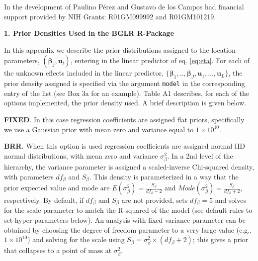 \documentclass[article,shortnames,nojss]{jss}
\begin{document}
In the development of  Paulino P\'erez and 
Gustavo de los Campos had financial support 
provided by NIH Grants: R01GM099992 and R01GM101219.



\appendix
\appendixpage

\textbf{\large{1. Prior Densities Used in the BGLR R-Package}}
\vspace{0.5cm}

In this appendix we describe the prior distributions assigned 
to the location parameters, $(\boldsymbol \beta_j, \boldsymbol u_l)$,
entering in the linear predictor of eq. \eqref{eq:eta}. For each of the unknown effects included in the linear predictor, 
$\{\boldsymbol \beta_1,..,\boldsymbol \beta_J,\boldsymbol u_1,...,\boldsymbol u_L\}$, 
the prior density assigned is specified via 
the argument \texttt{model} in the corresponding entry of the list 
(see Box 3a for an example).  Table A1 describes, for each of 
the options implemented, the prior density used. 
A brief description is given below. 

\textbf{FIXED}. In this case regression coefficients 
are assigned flat priors, specifically we use a Gaussian 
prior with mean zero and variance equal to $1 \times 10^{10}$.

\textbf{BRR}. When this option is used regression coefficients 
are assigned normal IID normal distributions, with mean zero and 
variance $\sigma_\beta^2$. In a 2nd level of the hierarchy, 
the variance parameter is assigned a scaled-inverse Chi-squared density, 
with parameters $df_\beta$ and $S_\beta$. This density is 
parameterized in a way that the prior expected value 
and mode are $E(\sigma^2_\beta)=\frac{S_\beta}{df_\beta-2}$ and 
$Mode(\sigma^2_\beta)=\frac{S_\beta}{df_\beta+2}$, respectively. 
By default, if $df_\beta$ and $S_\beta$ are not provided, 
 sets  $df_\beta=5$ and solves for the scale 
parameter to match the R-squared of the model 
(see default rules to set hyper-parameters below). An analysis 
with fixed variance parameter can be obtained by 
choosing the degree of freedom parameter to a very large 
value (e.g., $1 \times 10^{10}$) and solving for 
the scale using $S_\beta=\sigma^2_\beta\times (df_\beta+2)$; this gives 
a prior that collapses to a point of mass at $\sigma^2_\beta$.
\end{document}
